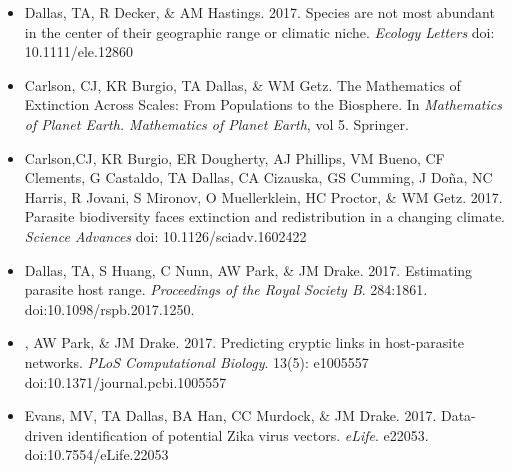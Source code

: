 \documentclass[]{CV}
\begin{document}
{}
\begin{itemize}

\item {\mefont Dallas, TA}, R Decker, \& AM Hastings. 2017. Species are not most abundant in the center of their geographic range or climatic niche. \textit{Ecology Letters} doi: 10.1111/ele.12860

\item Carlson, CJ, KR Burgio, {\mefont TA Dallas}, \& WM Getz. The Mathematics of Extinction Across Scales: From Populations to the Biosphere. In \textit{Mathematics of Planet Earth. Mathematics of Planet Earth}, vol 5. Springer. 

\item \OA Carlson,CJ, KR Burgio, ER Dougherty, AJ Phillips, VM Bueno, CF Clements, G Castaldo, {\mefont TA Dallas}, CA Cizauska, GS Cumming, J Do\~na, NC Harris, R Jovani, S Mironov, O Muellerklein, HC Proctor, \& WM Getz. 2017. Parasite biodiversity faces extinction and redistribution in a changing climate. \textit{Science Advances} doi: 10.1126/sciadv.1602422

\item {\mefont Dallas, TA}, S Huang, C Nunn, AW Park, \& JM Drake. 2017. Estimating parasite host range. \textit{Proceedings of the Royal Society B}. 284:1861. doi:10.1098/rspb.2017.1250.

\item {}, AW Park, \& JM Drake. 2017. Predicting cryptic links in host-parasite networks. \textit{PLoS Computational Biology}. 13(5): e1005557 doi:10.1371/journal.pcbi.1005557

\item \OA Evans, MV, {\mefont TA Dallas}, BA Han, CC Murdock, \& JM Drake. 2017. Data-driven identification of potential Zika virus vectors. \textit{eLife}. e22053. doi:10.7554/eLife.22053

\end{itemize}
\end{document}
